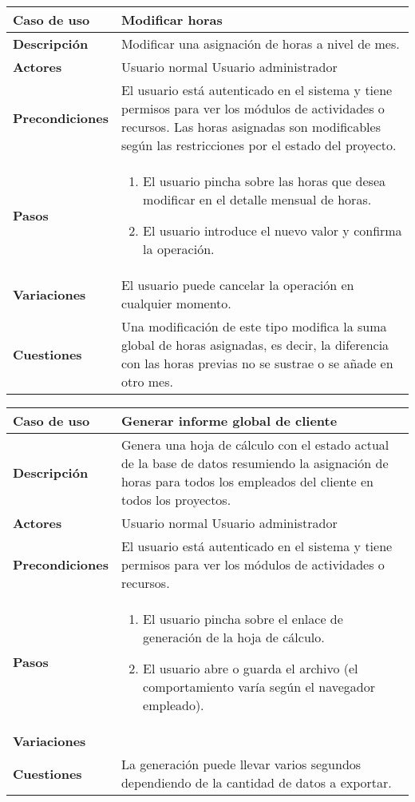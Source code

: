 \begin{tabular}{|p{1.25in}|p{3.65in}|}\hline
\textbf{Caso de uso} & \textbf{Modificar horas}\\\hline\hline
\textbf{Descripción} & Modificar una asignación de horas a nivel de mes.
\\\hline
\textbf{Actores} & Usuario normal \newline Usuario administrador\\\hline
\textbf{Precondiciones} & El usuario está autenticado en el sistema y
tiene permisos para ver los módulos de actividades o recursos. Las horas
asignadas son modificables según las restricciones por el estado del
proyecto. \\\hline
\textbf{Pasos} &
  \begin{enumerate}
   \item El usuario pincha sobre las horas que desea modificar en el detalle
mensual de horas.
   \item El usuario introduce el nuevo valor y confirma la operación.
  \end{enumerate}
\\\hline
\textbf{Variaciones} & El usuario puede cancelar la operación en
cualquier momento.\\\hline
\textbf{Cuestiones} & Una modificación de este tipo modifica la suma
global de horas asignadas, es decir, la diferencia con las horas previas
no se sustrae o se añade en otro mes.\\\hline
\end{tabular}

\begin{tabular}{|p{1.25in}|p{3.65in}|}\hline
\textbf{Caso de uso} & \textbf{Generar informe global de cliente}\\\hline\hline
\textbf{Descripción} & Genera una hoja de cálculo con el estado actual de la
base de datos resumiendo la asignación de horas para todos los empleados del
cliente en todos los proyectos.
\\\hline
\textbf{Actores} & Usuario normal \newline Usuario administrador\\\hline
\textbf{Precondiciones} & El usuario está autenticado en el sistema y
tiene permisos para ver los módulos de actividades o recursos. \\\hline
\textbf{Pasos} &
  \begin{enumerate}
   \item El usuario pincha sobre el enlace de generación de la hoja de cálculo.
   \item El usuario abre o guarda el archivo (el comportamiento varía según el
navegador empleado).
  \end{enumerate}
\\\hline
\textbf{Variaciones} & \\\hline
\textbf{Cuestiones} & La generación puede llevar varios segundos
dependiendo de la cantidad de datos a exportar.\\\hline
\end{tabular}

